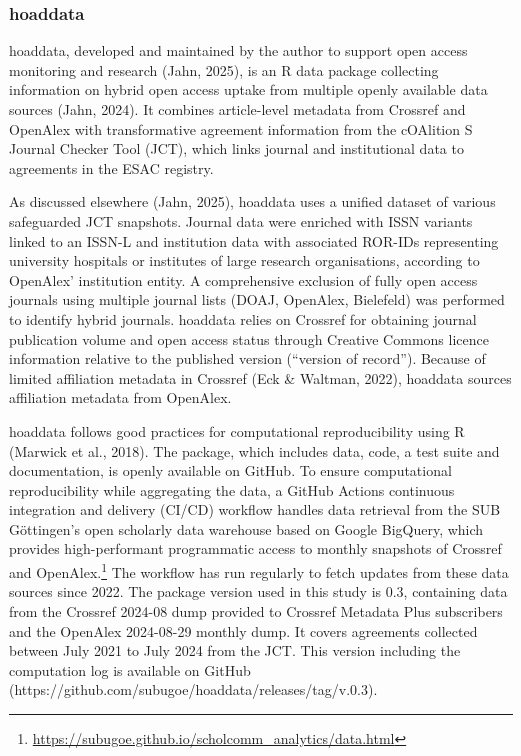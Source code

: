 \documentclass[a4paper,man,floatsintext,longtable,noextraspace,10pt]{apa6}
\begin{document}
\subsubsection{hoaddata}\label{hoaddata}

hoaddata, developed and maintained by the author to support open access
monitoring and research (Jahn, 2025), is an R data package collecting
information on hybrid open access uptake from multiple openly available
data sources (Jahn, 2024). It combines article-level metadata from
Crossref and OpenAlex with transformative agreement information from the
cOAlition S Journal Checker Tool (JCT), which links journal and
institutional data to agreements in the ESAC registry.

As discussed elsewhere (Jahn, 2025), hoaddata uses a unified dataset of
various safeguarded JCT snapshots. Journal data were enriched with ISSN
variants linked to an ISSN-L and institution data with associated
ROR-IDs representing university hospitals or institutes of large
research organisations, according to OpenAlex' institution entity. A
comprehensive exclusion of fully open access journals using multiple
journal lists (DOAJ, OpenAlex, Bielefeld) was performed to identify
hybrid journals. hoaddata relies on Crossref for obtaining journal
publication volume and open access status through Creative Commons
licence information relative to the published version (``version of
record''). Because of limited affiliation metadata in Crossref (Eck \&
Waltman, 2022), hoaddata sources affiliation metadata from OpenAlex.

hoaddata follows good practices for computational reproducibility using
R (Marwick et al., 2018). The package, which includes data, code, a test
suite and documentation, is openly available on GitHub. To ensure
computational reproducibility while aggregating the data, a GitHub
Actions continuous integration and delivery (CI/CD) workflow handles
data retrieval from the SUB Göttingen's open scholarly data warehouse
based on Google BigQuery, which provides high-performant programmatic
access to monthly snapshots of Crossref and OpenAlex.\footnote{\url{https://subugoe.github.io/scholcomm_analytics/data.html}}
The workflow has run regularly to fetch updates from these data sources
since 2022. The package version used in this study is 0.3, containing
data from the Crossref 2024-08 dump provided to Crossref Metadata Plus
subscribers and the OpenAlex 2024-08-29 monthly dump. It covers
agreements collected between July 2021 to July 2024 from the JCT. This
version including the computation log is available on GitHub
(https://github.com/subugoe/hoaddata/releases/tag/v.0.3).
\end{document}
